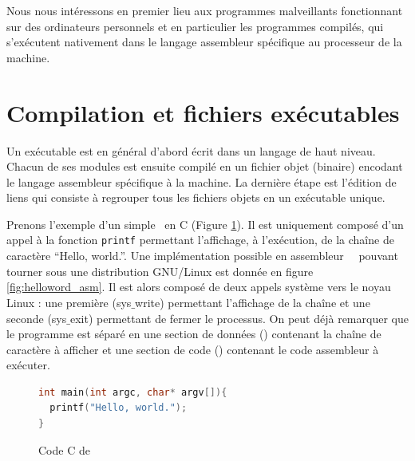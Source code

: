 
Nous nous intéressons en premier lieu aux programmes malveillants fonctionnant sur des ordinateurs personnels et en particulier les programmes compilés, qui s'exécutent nativement dans le langage assembleur spécifique au processeur de la machine.


\section{Compilation et fichiers exécutables}
Un exécutable est en général d'abord écrit dans un langage de haut niveau. Chacun de ses modules est ensuite compilé en un fichier objet (binaire) encodant le langage assembleur spécifique à la machine. La dernière étape est l'édition de liens qui consiste à regrouper tous les fichiers objets en un exécutable unique.

Prenons l'exemple d'un simple \helloworld\ en C (Figure \ref{fig:helloword_c}). Il est uniquement composé d'un appel à la fonction \texttt{printf} permettant l'affichage, à l'exécution, de la chaîne de caractère ``Hello, world.''.
Une implémentation possible en assembleur \nasm\ \xq\ pouvant tourner sous une distribution GNU/Linux est donnée en figure \ref{fig:helloword_asm}. Il est alors composé de deux appels système vers le noyau Linux : une première (sys$\_$write) permettant l'affichage de la chaîne et une seconde (sys$\_$exit) permettant de fermer le processus.
On peut déjà remarquer que le programme est séparé en une section de données (\pdata) contenant la chaîne de caractère à afficher et une section de code (\ptext) contenant le code assembleur à exécuter.
\begin{figure}
\begin{lstlisting}[language={C}]
int main(int argc, char* argv[]){
  printf("Hello, world.");
}
\end{lstlisting}
\caption{Code C de \helloworld}
\label{fig:helloword_c}
\end{figure}


